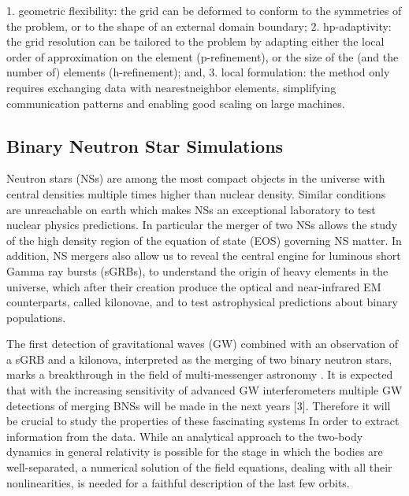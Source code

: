 1. geometric flexibility: the grid can be deformed to conform to the symmetries of the problem, or to the shape of an external domain boundary;
2. hp-adaptivity: the grid resolution can be tailored to the problem by adapting either the local order of approximation on the element (p-refinement),
or the size of the (and the number of) elements (h-refinement); and,
3. local formulation: the method only requires exchanging data with nearestneighbor
elements, simplifying communication patterns and enabling good
scaling on large machines.


\subsection{Binary Neutron Star Simulations}

Neutron stars (NSs) are among the most compact objects in
the universe with central densities multiple times higher than
nuclear density. Similar conditions are unreachable on earth
which makes NSs an exceptional laboratory to test nuclear
physics predictions. In particular the merger of two NSs
allows the study of the high density region of the equation
of state (EOS) governing NS matter. In addition, NS mergers
also allow us to reveal the central engine for luminous short
Gamma ray bursts (sGRBs), to understand the origin of
heavy elements in the universe, which after their creation
produce the optical and near-infrared EM counterparts, called
kilonovae, and to test astrophysical predictions about binary
populations.

The first detection of gravitational waves (GW) combined
with an observation of a sGRB and a kilonova, interpreted as the merging of two binary neutron stars,  marks a breakthrough in the field of multi-messenger astronomy \cite{abbott2017gw170817}. It is
expected that with the increasing sensitivity of advanced GW
interferometers multiple GW detections of merging BNSs will
be made in the next years [3]. Therefore it will be crucial
to study the properties of these fascinating systems In order to extract information
from the data. While an analytical approach to the two-body dynamics
in general relativity is possible for the stage in which the
bodies are well-separated, a numerical solution of the field
equations, dealing with all their nonlinearities, is needed for
a faithful description of the last few orbits.


